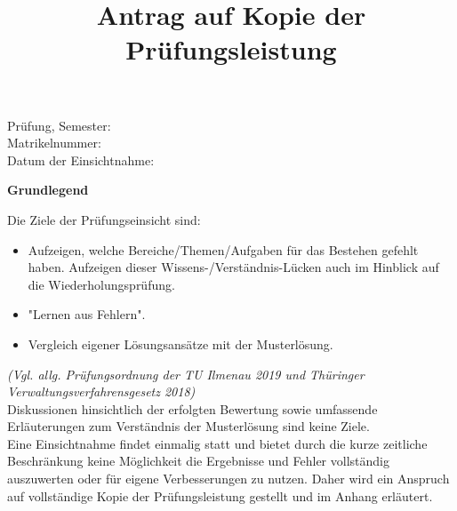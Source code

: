 \documentclass[12pt, a4paper]{article}
\title{Antrag auf Kopie der Prüfungsleistung}
\author{}
\date{}
\begin{document}
\maketitle

\begin{Form}
    \centering
    \noindent Prüfung, Semester: \TextField[name=Prüfung,width=8cm, charsize=10pt, bordercolor={0 1 1}, value={}] {\mbox{}}\\
    \vspace{0.5cm}
    \noindent Matrikelnummer: \TextField[name=Matrikelnummer,width=8.4cm, charsize=10pt, bordercolor={0 1 1}, value={}] {\mbox{}}\\
    \vspace{0.5cm}
    \noindent Datum der Einsichtnahme: \TextField[name=Matrikelnummer,width=6.6cm, charsize=10pt, bordercolor={0 1 1}, value={}] {\mbox{}}\\
    \vspace{0.5cm}
\end{Form}

\vspace{1cm}
\textbf{Grundlegend}

Die Ziele der Prüfungseinsicht sind:
\begin{itemize}
    \item Aufzeigen, welche Bereiche/Themen/Aufgaben für das Bestehen gefehlt haben. Aufzeigen dieser Wissens-/Verständnis-Lücken auch im Hinblick auf die Wiederholungsprüfung.
    \item "Lernen aus Fehlern".
    \item Vergleich eigener Lösungsansätze mit der Musterlösung.
\end{itemize}
\textit{\scriptsize(Vgl. allg. Prüfungsordnung der TU Ilmenau 2019 und Thüringer Verwaltungsverfahrensgesetz 2018)}\\
Diskussionen hinsichtlich der erfolgten Bewertung sowie umfassende Erläuterungen zum Verständnis der Musterlösung sind keine Ziele. \\
Eine Einsichtnahme findet einmalig statt und bietet durch die kurze zeitliche Beschränkung keine Möglichkeit die Ergebnisse und Fehler vollständig auszuwerten oder für eigene Verbesserungen zu nutzen. Daher wird ein Anspruch auf vollständige Kopie der Prüfungsleistung gestellt und im Anhang erläutert.

\vspace{2cm}
\end{document}
